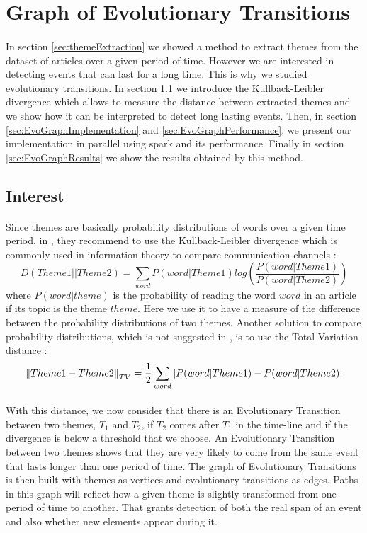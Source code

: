 \section{Graph of Evolutionary Transitions}
\paragraph{}
In section \ref{sec:themeExtraction} we showed a method to extract themes from the dataset of articles over a given period of time. However we are interested in detecting events that can last for a long time. This is why we studied evolutionary transitions. In section \ref{sec:EvoGraphInterest} we introduce the Kullback-Leibler divergence which allows to measure the distance between extracted themes and we show how it can be interpreted to detect long lasting events. Then, in section \ref{sec:EvoGraphImplementation} and \ref{sec:EvoGraphPerformance}, we present our implementation in parallel using spark and its performance. Finally in section \ref{sec:EvoGraphResults} we show the results obtained by this method.

\subsection{Interest}
\label{sec:EvoGraphInterest}

\paragraph{}
Since themes are basically probability distributions of words over a given time period, in \cite{kdd05-ttm}, they recommend to use the Kullback-Leibler divergence which is commonly used in information theory to compare communication channels \cite{kullback1997information} :\[ D(Theme1 || Theme2) = \sum_{word} P(word|Theme1) log(\frac{P(word|Theme1)}{P(word|Theme2)})\]where $P(word|theme)$ is the probability of reading the word $word$ in an article if its topic is the theme $theme$. Here we use it to have a measure of the difference between the probability distributions of two themes. Another solution to compare probability distributions, which is not suggested in \cite{kdd05-ttm}, is to use the Total Variation distance \cite{INSR419} :\[ \left\lVert Theme1 - Theme2\right\rVert_{TV} = \frac{1}{2} \sum_{word} |P(word|Theme1) - P(word|Theme2)|\]

\paragraph{}
With this distance, we now consider that there is an Evolutionary Transition between two themes, $T_1$ and $T_2$, if $T_2$ comes after $T_1$ in the time-line and if the divergence is below a threshold that we choose. An Evolutionary Transition between two themes shows that they are very likely to come from the same event that lasts longer than one period of time. The graph of Evolutionary Transitions is then built with themes as vertices and evolutionary transitions as edges. Paths in this graph will reflect how a given theme is slightly transformed from one period of time to another. That grants detection of both the real span of an event and also whether new elements appear during it.

